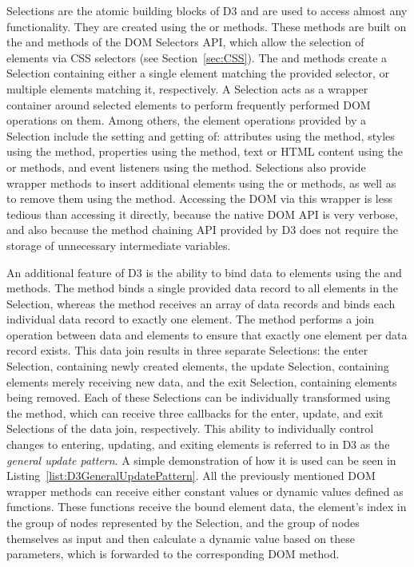 Selections are the atomic building blocks of D3 and are used to access
almost any functionality. They are created using the
 or  methods. These
methods are built on the  and
 methods of the DOM Selectors API, which
allow the selection of elements via CSS selectors (see
Section~\ref{sec:CSS}). The  and
 methods create a Selection containing either
a single element matching the provided selector, or multiple elements
matching it, respectively. A Selection acts as a wrapper container
around selected elements to perform frequently performed DOM
operations on them. Among others, the element operations provided by
a Selection include the setting and getting of: attributes using the
 method, styles using the
 method, properties using the
 method, text or HTML content using the
 or  methods, and
event listeners using the  method. Selections
also provide wrapper methods to insert additional elements using the
 or  methods,
as well as to remove them using the 
method. Accessing the DOM via this wrapper is less tedious than
accessing it directly, because the native DOM API is very verbose, and
also because the method chaining API provided by D3 does not require
the storage of unnecessary intermediate variables.

An additional feature of D3 is the ability to bind data to elements
using the  and  methods.
The  method binds a single provided data record
to all elements in the Selection, whereas the 
method receives an array of data records and binds each individual
data record to exactly one element. The  method
performs a join operation between data and elements to ensure that
exactly one element per data record exists. This data join results in
three separate Selections: the enter Selection, containing newly
created elements, the update Selection, containing elements merely
receiving new data, and the exit Selection, containing elements being
removed. Each of these Selections can be individually transformed
using the  method, which can receive three
callbacks for the enter, update, and exit Selections of the data join,
respectively. This ability to individually control changes to
entering, updating, and exiting elements is referred to in D3 as the
\emph{general update pattern}. A simple demonstration of how it is
used can be seen in Listing~\ref{list:D3GeneralUpdatePattern}. All the
previously mentioned DOM wrapper methods can receive either constant
values or dynamic values defined as functions. These functions receive
the bound element data, the element's index in the group of nodes
represented by the Selection, and the group of nodes themselves as
input and then calculate a dynamic value based on these parameters,
which is forwarded to the corresponding DOM method.


